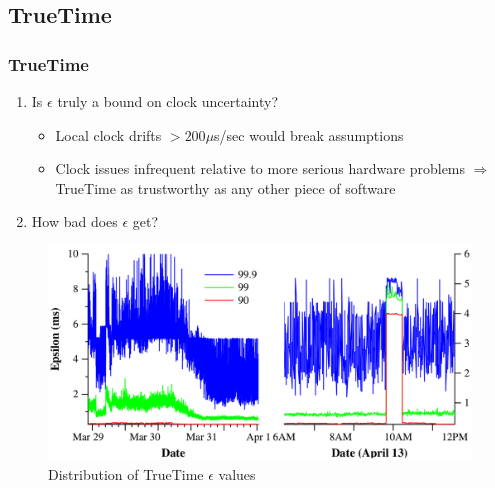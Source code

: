\documentclass{beamer}
\begin{document}
\subsection{TrueTime}
\begin{frame}
  \frametitle{TrueTime}
  \begin{enumerate}
    \item{Is $\epsilon$ truly a bound on clock uncertainty?
      \begin{itemize}
        \item{Local clock drifts $> 200\mu$s/sec would break assumptions}
        \item{Clock issues infrequent relative to more serious hardware problems
          \newline $\Rightarrow$ TrueTime as trustworthy as any other piece of
          software
        }
      \end{itemize}
    }
    \pause
    \item{How bad does $\epsilon$ get?}
  \end{enumerate}
  \begin{figure}
    \centering
    \includegraphics[width=.6\textwidth]{figures/epsilon.png}
    \caption{Distribution of TrueTime $\epsilon$ values}
  \end{figure}
\end{frame}

\end{document}
